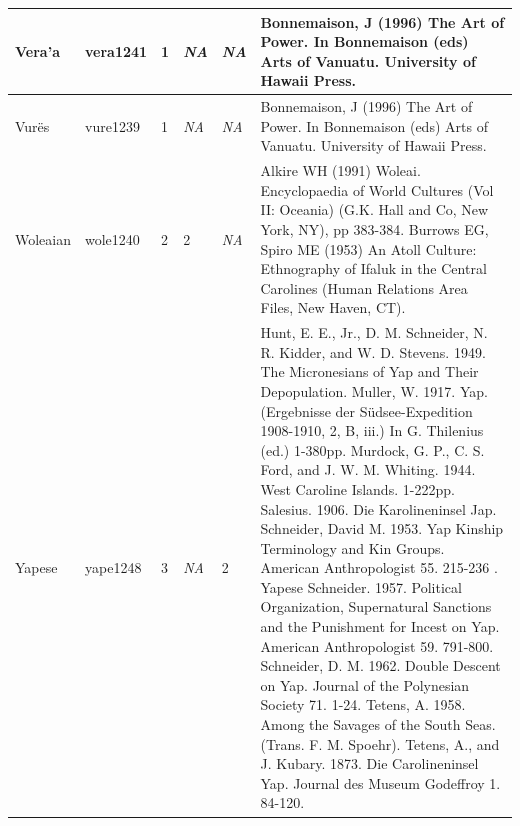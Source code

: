 \documentclass[a4paper,10pt]{article} %
\begin{document}
\begin{landscape}
\begin{longtable}{ | p{2cm}| p{2cm}| p{1.8cm}| p{1.8cm}| p{3cm}| p{9cm}| }
Vera'a&vera1241&1&\emph{NA}&\emph{NA}&Bonnemaison, J (1996) The Art of Power. In Bonnemaison (eds) Arts of Vanuatu. University of Hawaii Press.\\ \hline
Vurës&vure1239&1&\emph{NA}&\emph{NA}&Bonnemaison, J (1996) The Art of Power. In Bonnemaison (eds) Arts of Vanuatu. University of Hawaii Press.\\ \hline
Woleaian&wole1240&2&2&\emph{NA}&Alkire WH (1991) Woleai. Encyclopaedia of World Cultures (Vol II: Oceania) (G.K. Hall and Co, New York, NY), pp 383-384. Burrows EG, Spiro ME (1953) An Atoll Culture: Ethnography of Ifaluk in the Central Carolines (Human Relations Area Files, New Haven, CT). \\ \hline
Yapese&yape1248&3&\emph{NA}&2&Hunt, E. E., Jr., D. M. Schneider, N. R. Kidder, and W. D. Stevens. 1949. The Micronesians of Yap and Their Depopulation. Muller, W. 1917. Yap. (Ergebnisse der Südsee-Expedition 1908-1910, 2, B, iii.) In G. Thilenius (ed.) 1-380pp. Murdock, G. P., C. S. Ford, and J. W. M. Whiting. 1944. West Caroline Islands. 1-222pp. Salesius. 1906. Die Karolineninsel Jap. Schneider, David M. 1953. Yap Kinship Terminology and Kin Groups. American Anthropologist 55. 215-236 .  Yapese   Schneider. 1957. Political Organization, Supernatural Sanctions and the Punishment for Incest on Yap. American Anthropologist 59. 791-800. Schneider, D. M. 1962. Double Descent on Yap. Journal of the Polynesian Society 71. 1-24. Tetens, A. 1958. Among the Savages of the South Seas. (Trans. F. M. Spoehr). Tetens, A., and J. Kubary. 1873. Die Carolineninsel Yap. Journal des Museum Godeffroy 1. 84-120.\\ \hline



 \end{longtable}

\end{landscape}

\newpage
\end{document}
